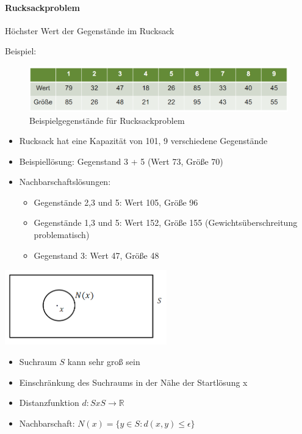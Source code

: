 \documentclass[
    ngerman,
    color=3b,
    dark_mode,
    load_common, %
    summary,
    boxarc,
]{tuda_summary}
\begin{document}
\paragraph{Rucksackproblem}\mbox{}
\begin{grayInfoBox}
     Höchster Wert der Gegenstände im Rucksack
\end{grayInfoBox}
Beispiel:
\begin{figure}[h]
    \centering
    \includegraphics[width=12cm]{pictures/rucksack1.PNG}
    \caption{Beispielgegenstände für Rucksackproblem}
\end{figure}
\begin{itemize}
    \item Rucksack hat eine Kapazität von 101, 9 verschiedene Gegenstände
\end{itemize}
\begin{itemize}
    \item Beispiellösung: Gegenstand 3 + 5 (Wert 73, Grö\ss{}e 70)
    \item Nachbarschaftslösungen:
          \begin{itemize}
              \item Gegenstände 2,3 und 5: Wert 105, Grö\ss{}e 96
              \item Gegenstände 1,3 und 5: Wert 152, Grö\ss{}e 155 (Gewichtsüberschreitung problematisch)
              \item Gegenstand 3: Wert 47, Grö\ss{}e 48
          \end{itemize}
\end{itemize}
\begin{minipage}{7.2cm}
    \includegraphics[width=7cm]{pictures/nachbarschaft.PNG}
\end{minipage}
\begin{minipage}{\textwidth-7.2cm-2.22168pt}
    \begin{itemize}
        \item Suchraum $S$ kann sehr gro\ss{} sein
        \item Einschränkung des Suchraums in der Nähe der Startlösung x
        \item Distanzfunktion $d: S x S \rightarrow \mathbb{R}$
        \item Nachbarschaft: $N(x) = \{y \in S: d(x,y) \leq \epsilon\}$
    \end{itemize}
\end{minipage}
\clearpage
\end{document}
